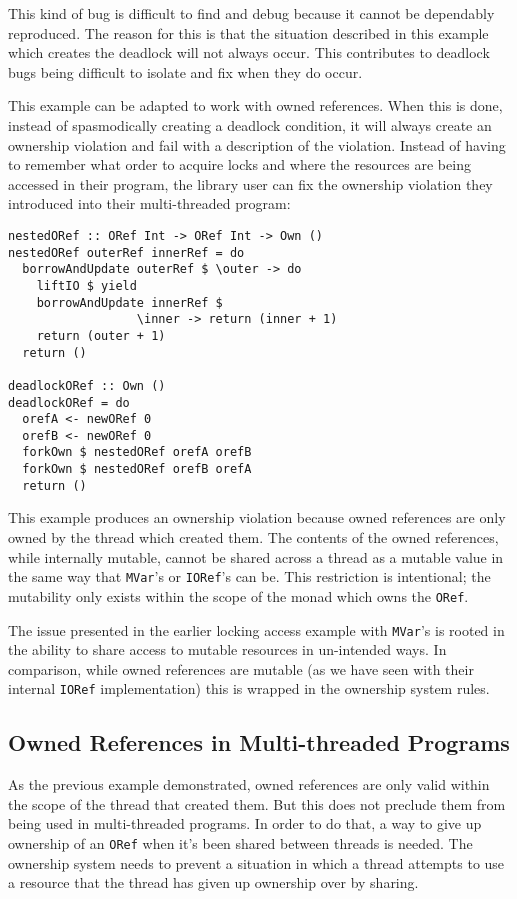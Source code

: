 \documentclass[onehalf,11pt]{beavtex}
\begin{document}
This kind of bug is difficult to find and debug because it cannot be dependably
reproduced.  The reason for this is that the situation described in this
example which creates the deadlock will not always occur.
This contributes to deadlock bugs being difficult to isolate and fix when they
do occur.

This example can be adapted to work with owned references.
When this is done, instead of spasmodically creating a deadlock condition,
it will always create an ownership violation and fail with a description of the
violation.
Instead of having to remember what order to acquire locks and where the
resources are being accessed in their program, the library user can fix the
ownership violation they introduced into their multi-threaded program:

\begin{lstlisting}
nestedORef :: ORef Int -> ORef Int -> Own ()
nestedORef outerRef innerRef = do
  borrowAndUpdate outerRef $ \outer -> do
    liftIO $ yield
    borrowAndUpdate innerRef $ 
                  \inner -> return (inner + 1)
    return (outer + 1)
  return ()

deadlockORef :: Own ()
deadlockORef = do
  orefA <- newORef 0
  orefB <- newORef 0
  forkOwn $ nestedORef orefA orefB
  forkOwn $ nestedORef orefB orefA
  return ()
\end{lstlisting}

This example produces an ownership violation because owned references are only
owned by the thread which created them.
The contents of the owned references, while internally mutable, cannot be shared
across a thread as a mutable value in the same way that \texttt{MVar}'s or
\texttt{IORef}'s can be.
This restriction is intentional; the mutability only exists within the scope of
the monad which owns the \texttt{ORef}.

The issue presented in the earlier locking access example with \texttt{MVar}'s
is rooted in the ability to share access to mutable resources in un-intended
ways.  In comparison, while owned references are mutable (as we have seen with
their internal \texttt{IORef} implementation) this is wrapped in the ownership
system rules.

\subsection{Owned References in Multi-threaded Programs}

As the previous example demonstrated, owned references are only valid within the
scope of the thread that created them.  But this does not preclude them from
being used in multi-threaded programs.
In order to do that, a way to give up ownership of an \texttt{ORef} when it's
been shared between threads is needed.
The ownership system needs to prevent a situation in which a thread attempts to
use a resource that the thread has given up ownership over by sharing. 
\end{document}
